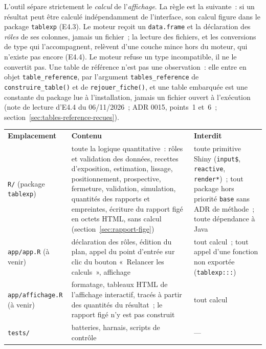 \documentclass[a4paper,11pt]{article}
\newcommand{\code}[1]{\texttt{\small #1}}
\begin{document}
L'outil sépare strictement le \emph{calcul} de l'\emph{affichage}. La règle
est la suivante~: si un résultat peut être calculé indépendamment de
l'interface, son calcul figure dans le package \code{tablexp} (E4.3). Le moteur
reçoit un \code{data.frame} et la déclaration des \emph{rôles} de ses colonnes,
jamais un fichier~; la lecture des fichiers, et les conversions de type qui
l'accompagnent, relèvent d'une couche mince hors du moteur, qui n'existe pas
encore (E4.4). Le moteur refuse un type incompatible, il ne le convertit pas.
Une table de référence n'est pas une observation~: elle entre en objet
\code{table\_reference}, par l'argument \code{tables\_reference} de
\code{construire\_table()} et de \code{rejouer\_fiche()}, et une table
embarquée est une constante du package lue à l'installation, jamais un
fichier ouvert à l'exécution (note de lecture d'E4.4 du 06/11/2026~; ADR
0015, points~1 et~6~; section~\ref{sec:tables-reference-recues}).

\begin{center}
\small
{}
\begin{tabular}{@{}p{3.6cm}p{5.6cm}p{5.6cm}@{}}
\rowcolor{tableheader}
\textcolor{financeblue}{\textbf{Emplacement}} &
\textcolor{financeblue}{\textbf{Contenu}} &
\textcolor{financeblue}{\textbf{Interdit}} \\
\code{R/} (package \code{tablexp}) & toute la logique quantitative~: rôles et
validation des données, recettes d'exposition, estimation, lissage,
positionnement, prospective, fermeture, validation, simulation, quantités des
rapports et empreintes, écriture du rapport figé en octets HTML, sans calcul
(section~\ref{sec:rapport-fige}) & toute primitive Shiny (\code{input\$},
\code{reactive}, \code{render*})~; tout package hors priorité \code{base}
sans ADR de méthode~; toute dépendance à Java \\
\code{app/app.R} (à venir) & déclaration des rôles, édition du plan, appel du
point d'entrée sur clic du bouton «~Relancer les calculs~», affichage &
tout calcul~; tout appel d'une fonction non exportée (\code{tablexp:::}) \\
\code{app/affichage.R} (à venir) & formatage, tableaux HTML de l'affichage
interactif, tracés à partir des quantités du résultat~; le rapport figé n'y
est pas construit & tout calcul \\
\code{tests/} & batteries, harnais, scripts de contrôle & --- \\
\end{tabular}
\end{center}
\end{document}
